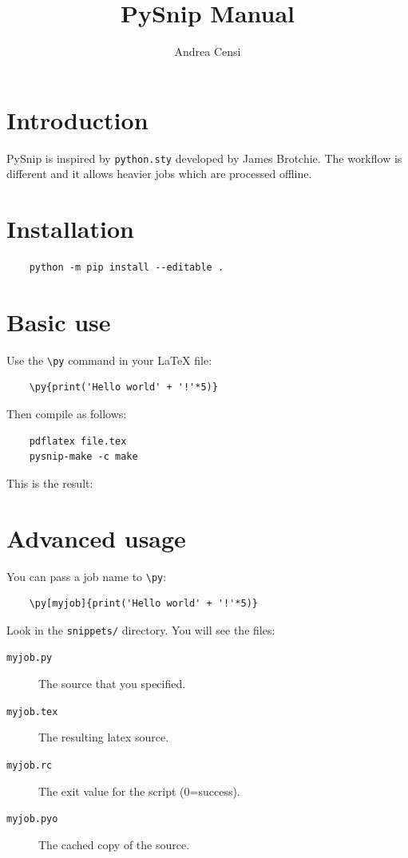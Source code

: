 \documentclass{article}
\title{ PySnip Manual}
\author{Andrea Censi}
\newcommand{\cmd}[1]{\texttt{\textbackslash #1}}
\begin{document}
  \maketitle


  \section{Introduction}

  PySnip is inspired by \texttt{python.sty} developed by James Brotchie.
  The workflow is different and it allows heavier jobs which are processed
  offline.


  \section{Installation}

  \begin{verbatim}
    python -m pip install --editable .
  \end{verbatim}


  \section{Basic use}

  Use the \cmd{py} command in your LaTeX file:
  \begin{verbatim}
    \py{print('Hello world' + '!'*5)}
  \end{verbatim}

  Then compile as follows:
  \begin{verbatim}
    pdflatex file.tex
    pysnip-make -c make
  \end{verbatim}

  This is the result:
  \begin{quote}
  \end{quote}


  \section{Advanced usage}

  You can pass a job name to \cmd{py}:
  \begin{verbatim}
    \py[myjob]{print('Hello world' + '!'*5)}
  \end{verbatim}

  Look in the \texttt{snippets/} directory. You will see the files:

  \begin{description}
    \item[\texttt{myjob.py}] The source that you specified.
    \item[\texttt{myjob.tex}] The resulting latex source.
    \item[\texttt{myjob.rc}] The exit value for the script (0=success).
    \item[\texttt{myjob.pyo}]  The cached copy of the source.
  \end{description}
\end{document}
